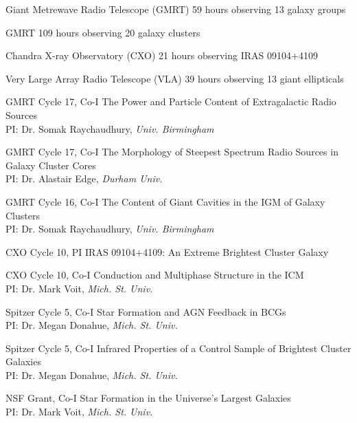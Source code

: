 \documentclass[12pt]{cv}
\begin{document}
\begin{llist}

Giant Metrewave Radio Telescope (GMRT)
59 hours observing 13 galaxy groups%

GMRT
109 hours observing 20 galaxy clusters%

Chandra X-ray Observatory (CXO)
21 hours observing IRAS 09104+4109%

Very Large Array Radio Telescope (VLA)
39 hours observing 13 giant ellipticals%



GMRT Cycle 17, Co-I
The Power and Particle Content of Extragalactic Radio Sources\\%
PI: Dr. Somak Raychaudhury, {\textit{Univ. Birmingham}}

GMRT Cycle 17, Co-I
The Morphology of Steepest Spectrum Radio Sources in Galaxy Cluster Cores\\%
PI: Dr. Alastair Edge, {\textit{Durham Univ.}}

GMRT Cycle 16, Co-I
The Content of Giant Cavities in the IGM of Galaxy Clusters\\%
PI: Dr. Somak Raychaudhury, {\textit{Univ. Birmingham}}

CXO Cycle 10, PI
IRAS 09104+4109: An Extreme Brightest Cluster Galaxy%

CXO Cycle 10, Co-I
Conduction and Multiphase Structure in the ICM\\%
PI: Dr. Mark Voit, {\textit{Mich. St. Univ.}}

Spitzer Cycle 5, Co-I
Star Formation and AGN Feedback in BCGs\\%
PI: Dr. Megan Donahue, {\textit{Mich. St. Univ.}}

Spitzer Cycle 5, Co-I
Infrared Properties of a Control Sample of Brightest Cluster Galaxies\\%
PI: Dr. Megan Donahue, {\textit{Mich. St. Univ.}}

NSF Grant, Co-I
Star Formation in the Universe's Largest Galaxies\\%
PI: Dr. Mark Voit, {\textit{Mich. St. Univ.}}


\end{llist}
\end{document}
